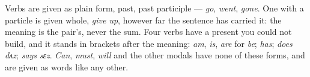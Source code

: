 {\smallskip
Verbs are given as plain form, past, past participle — \textit{go},
\textit{went}, \textit{gone}. One with a particle is given whole,
\textit{give up}, however far the sentence has carried it: the meaning is the
pair's, never the sum. Four verbs have a present you could not build, and it
stands in brackets after the meaning: \textit{am}, \textit{is}, \textit{are}
for \textit{be}; \textit{has}; \textit{does} \textit{dʌz}; \textit{says}
\textit{sɛz}. \textit{Can}, \textit{must}, \textit{will} and the other
modals have none of these forms, and are given as words like any other.
}
